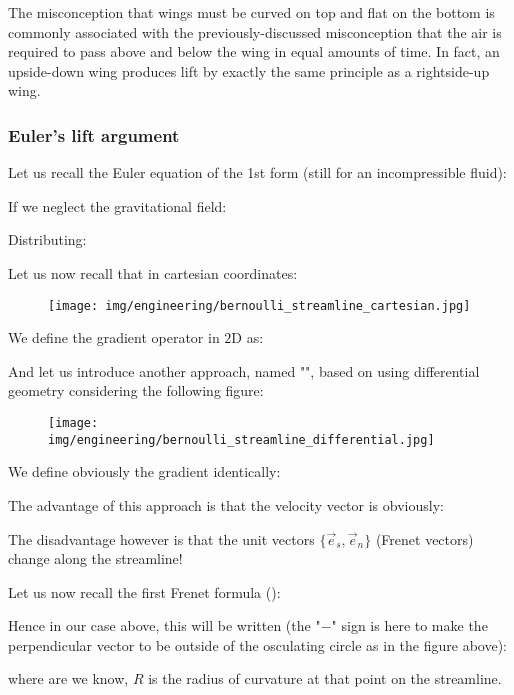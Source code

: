 	 \begin{tcolorbox}[title=Remark,colframe=black,arc=10pt]
	The misconception that wings must be curved on top and flat on the bottom is commonly associated with the previously-discussed misconception that the air is required to pass above and below the wing in equal amounts of time. In fact, an upside-down wing produces lift by exactly the same principle as a rightside-up wing.
	\end{tcolorbox}
	

	\subsubsection{Euler's lift argument}
	Let us recall the Euler equation of the 1st form (still for an incompressible fluid):
	
	If we neglect the gravitational field:
	
	Distributing:
	
	Let us now recall that in cartesian coordinates:
	\begin{figure}[H]
		\centering
		\texttt{[image: img/engineering/bernoulli\_streamline\_cartesian.jpg]}
	\end{figure}
	We define the gradient operator in $2$D as:
	
	And let us introduce another approach, named "", based on using differential geometry considering the following figure:
	\begin{figure}[H]
		\centering
		\texttt{[image: img/engineering/bernoulli\_streamline\_differential.jpg]}
	\end{figure}
	We define obviously the gradient identically:
	
	The advantage of this approach is that the velocity vector is obviously:
	
	The disadvantage however is that the unit vectors $\{\vec{e}_s,\vec{e}_n\}$ (Frenet vectors) change along the streamline!
	
	Let us now recall the first Frenet formula ():
	
	Hence in our case above, this will be written (the "$-$" sign is here to make the perpendicular vector to be outside of the osculating circle as in the figure above):
	
	where are we know, $R$ is the radius of curvature at that point on the streamline.
	
